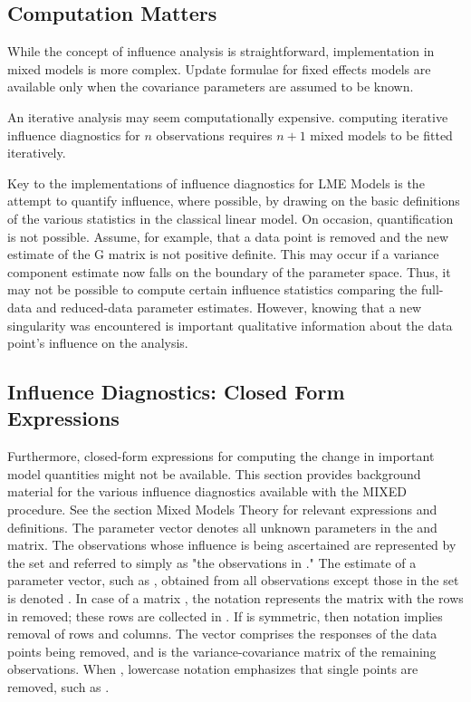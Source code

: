 \documentclass[12pt, a4paper]{report}
\theoremstyle{plain}
\theoremstyle{definition}
\theoremstyle{remark}
\begin{document}


\subsection{Computation Matters}
While the concept of influence analysis is straightforward,
implementation in mixed models is more complex. Update formulae
for fixed effects models are available only when the covariance
parameters are assumed to be known.


An iterative analysis may seem computationally expensive.
computing iterative influence diagnostics for $n$ observations
requires $n+1$ mixed models to be fitted iteratively.


Key to the implementations of influence diagnostics for LME Models is the attempt to quantify influence, where possible, by drawing on the basic definitions of the various statistics in the classical linear	model. 
On occasion, quantification is not possible. Assume, for example, that a data point is removed
and the new estimate of the G matrix is not positive definite. This may occur if a variance component estimate now falls on the boundary of the parameter space. Thus, it may not be possible to compute certain influence statistics comparing the full-data and reduced-data parameter estimates. However, knowing that a new singularity was encountered is important qualitative information about the data point’s influence on	the analysis.



\subsection{Influence Diagnostics: Closed Form Expressions} %



Furthermore, closed-form expressions for computing the change in important model quantities might not be available.
This section provides background material for the various influence diagnostics available with the MIXED procedure. See the section Mixed Models Theory for relevant expressions and definitions. The parameter vector  denotes all unknown parameters in the  and  matrix.
The observations whose influence is being ascertained are represented by the set  and referred to simply as "the observations in ." The estimate of a parameter vector, such as , obtained from all observations except those in the set  is denoted . In case of a matrix , the notation  represents the matrix with the rows in  removed; these rows are collected in . If  is symmetric, then notation  implies removal of rows and columns. The vector  comprises the responses of the data points being removed, and  is the variance-covariance matrix of the remaining observations. When , lowercase notation emphasizes that single points are removed, such as .
\end{document}
